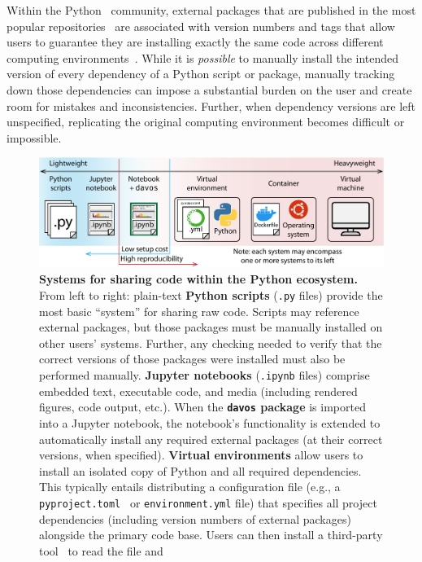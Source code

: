 \documentclass[preprint,12pt,a4paper]{elsarticle}
\begin{document}
Within the Python~\cite{vanR95} community, external packages that are
published in the most popular repositories~\cite{Pyth03, cond15} are
associated with version numbers and tags that allow users to guarantee
they are installing exactly the same code across different computing
environments~\cite{CoghStuf13}.  While it is \textit{possible} to
manually install the intended version of every dependency of a Python
script or package, manually tracking down those dependencies can
impose a substantial burden on the user and create room for mistakes
and inconsistencies. Further, when dependency versions are left
unspecified, replicating the original computing environment becomes
difficult or impossible.

\begin{figure}[tp]
\centering
\includegraphics[width=\textwidth]{figs/shareable_code}
\caption{\small \textbf{Systems for sharing code within the Python
    ecosystem.}  From left to right: plain-text \textbf{Python
    scripts} (\texttt{.py} files) provide the most basic ``system''
  for sharing raw code.  Scripts may reference external packages, but
  those packages must be manually installed on other users' systems.
  Further, any checking needed to verify that the correct versions of
  those packages were installed must also be performed manually.
  \textbf{Jupyter notebooks} (\texttt{.ipynb} files) comprise embedded
  text, executable code, and media (including rendered figures, code
  output, etc.).  When the \textbf{\texttt{davos} package} is imported
  into a Jupyter notebook, the notebook's functionality is extended to
  automatically install any required external packages (at their
  correct versions, when specified).  \textbf{Virtual environments}
  allow users to install an isolated copy of Python and all required
  dependencies. This typically entails distributing a configuration
  file (e.g., a \texttt{pyproject.toml}~\cite{CannEtal16} or
  \texttt{environment.yml} file) that specifies all project
  dependencies (including version numbers of external packages)
  alongside the primary code base. Users can then install a
  third-party tool~\cite[e.g.,][]{Anac12, Eust19} to read the file and
}
\end{figure}
\end{document}
